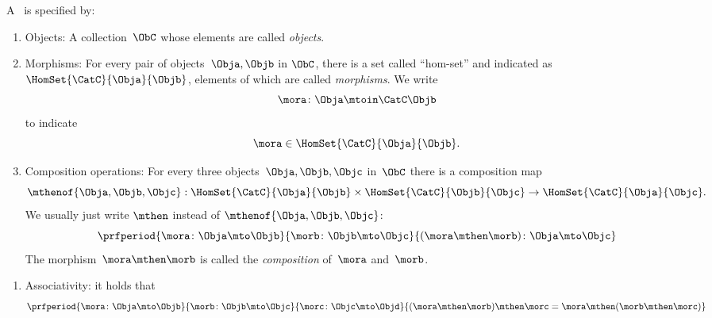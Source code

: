 \begin{ctdefinition}[Semicategory]
	\label{def:semicategory-compact}
	A \emph{}~\CatC is specified by:
	\begin{body}
		\constit
		\begin{enumerate}
			\item Objects: A collection\footnotemark~$\ObC$ whose elements are called \emph{objects}.
			\item Morphisms: For every pair of objects~$\Obja,\Objb$ in $\ObC$, there is a set called ``hom-set'' and indicated as~$\HomSet{\CatC}{\Obja}{\Objb}$, elements of which are called \emph{morphisms}.
			      We write
			      \begin{equation}
				      \mora \colon \Obja \mtoin\CatC \Objb
			      \end{equation}
			      to indicate
			      \begin{equation}
				      \mora \in \HomSet{\CatC}{\Obja}{\Objb}.
			      \end{equation}
			\item Composition operations: For every three objects~$\Obja,\Objb,\Objc$ in~$\ObC$ there is a composition map
			      \begin{equation}
				      \mthenof{\Obja,\Objb,\Objc}: \HomSet{\CatC}{\Obja}{\Objb} \times \HomSet{\CatC}{\Objb}{\Objc}\to \HomSet{\CatC}{\Obja}{\Objc}.
			      \end{equation}
			      We usually just write $\mthen$ instead of $\mthenof{\Obja,\Objb,\Objc}$:
			      \begin{equation}
				      \prfperiod{
					      \mora \colon \Obja \mto \Objb
				      }{
					      \morb\colon \Objb \mto \Objc
				      }{
					      (\mora \mthen \morb )\colon \Obja \mto \Objc
				      }
			      \end{equation}
			      The morphism~$\mora \mthen \morb$ is called the \emph{composition} of~$\mora$ and~$\morb$.
		\end{enumerate}
		\condit
		\begin{enumerate}
			\item Associativity: it holds that
			      \begin{equation}
				      \prfperiod{
					      \mora\colon \Obja \mto \Objb
				      }{
					      \morb\colon \Objb \mto \Objc
				      }{
					      \morc\colon \Objc \mto \Objd
				      }{
					      (\mora\mthen \morb)
					      \mthen \morc= \mora \mthen (\morb \mthen \morc)
				      }
			      \end{equation}
		\end{enumerate}
	\end{body}
\end{ctdefinition}

